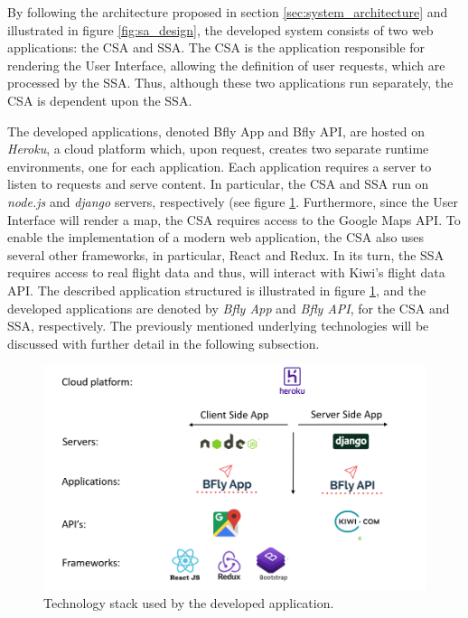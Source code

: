 By following the architecture proposed in section \ref{sec:system_architecture} and illustrated in figure \ref{fig:sa_design}, the developed system consists of two web applications: the CSA and SSA. The CSA is the application responsible for rendering the User Interface, allowing the definition of user requests, which are processed by the SSA. Thus, although these two applications run separately, the CSA is dependent upon the SSA. 



The developed applications, denoted Bfly App and Bfly API, are hosted on \textit{Heroku}, a cloud platform which, upon request, creates two separate runtime environments, one for each application. Each application requires a server to listen to requests and serve content. In particular, the CSA and SSA run on \textit{node.js} and \textit{django} servers, respectively (see figure \ref{fig:sa_structure}. Furthermore, since the User Interface will render a map, the CSA requires access to the Google Maps API. To enable the implementation of a modern web application, the CSA also uses several other frameworks, in particular, React and Redux. In its turn, the SSA requires access to real flight data and thus, will interact with Kiwi's flight data API. The described application structured is illustrated in figure \ref{fig:sa_structure}, and the developed applications are denoted by \textit{Bfly App} and \textit{Bfly API}, for the CSA and SSA, respectively. The previously mentioned underlying technologies will be discussed with further detail in the following subsection.  



\begin{figure}[htpb]
  \centering
  \includegraphics[width=.7\textwidth]{./Figures/system_implementation/system_architecture_implementation.png}
  \caption{Technology stack used by the developed application.}
  \label{fig:sa_structure}  
\end{figure}



